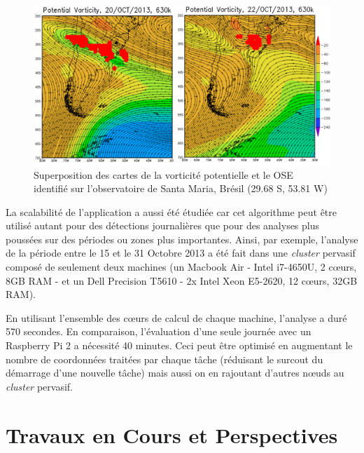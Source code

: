 \begin{figure}
	\centering
	\includegraphics[width=0.75\linewidth]{img/comparison2}
	\caption{Superposition des cartes de la vorticité potentielle et le OSE identifié sur l'observatoire de Santa Maria, Brésil (29.68 S, 53.81 W)}\label{fig:comparison}
\end{figure}

La scalabilité de l'application a aussi été étudiée car cet algorithme peut être utilisé autant pour des détections journalières que pour des analyses plus poussées sur des périodes ou zones plus importantes. Ainsi, par exemple, l'analyse de la période entre le 15 et le 31 Octobre 2013 a été fait dans une \textit{cluster} pervasif composé de seulement deux machines (un Macbook Air  - Intel i7-4650U, 2 c{\oe}urs, 8GB RAM -  et un Dell Precision T5610 - 2x Intel Xeon E5-2620, 12 c{\oe}urs, 32GB RAM). 

En utilisant l'ensemble des c{\oe}urs de calcul de chaque machine, l'analyse a duré 570 secondes. En comparaison, l'évaluation d'une seule journée avec un Raspberry Pi 2 a nécessité 40 minutes. Ceci peut être optimisé en augmentant le nombre de coordonnées traitées par chaque tâche (réduisant le surcout du démarrage d'une nouvelle tâche) mais aussi on en rajoutant d'autres n{\oe}uds au \textit{cluster} pervasif.  %

\section{Travaux en Cours et Perspectives}

